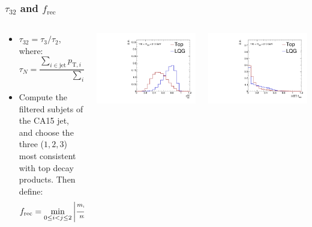 \documentclass[aspectratio=169,xcolor=dvipsnames,,table,compress]{beamer}
\begin{document}
\begin{frame} \frametitle{$\tau_{32}$ and $f_\mathrm{rec}$}
  \vspace{-5mm}
  \begin{columns}
    \begin{column}{0.5\textwidth}
      \begin{itemize}
        \item $\tau_{32} = \tau_3 / \tau_2$, where:
          \[
            \tau_N = \frac{\sum_{i\in\mathrm{jet}} p_{\mathrm{T},i} \min\{\Delta R_{ia} | a\in A\}}{\sum_{i\in\mathrm{jet}} p_{\mathrm{T},i} R}
          \]
        \item Compute the filtered subjets of the CA15 jet, and choose the three ($1,2,3$) most consistent with top decay products. Then define:
          \[
            f_\mathrm{rec} = \min_{0\leq i < j \leq 2} \left|
            \frac{\nicefrac{m_{ij}}{m_{123}}}{\nicefrac{m_W}{m_t}} - 1\right|
          \]
      \end{itemize}
    \end{column}
    \begin{column}{0.25\textwidth}
            \includegraphics[width=\textwidth]{../figures/toptagging/shapes/mass_fjTau32SD.pdf} \\
    \end{column}
    \begin{column}{0.25\textwidth}
            \includegraphics[width=\textwidth]{../figures/toptagging/shapes/mass_fjHTTFRec.pdf}

\end{column}
\end{columns}
\end{frame}
\end{document}

